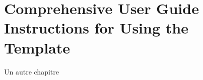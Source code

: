 \chapter[Comprehensive User Guide: Instructions for Using the Template]{Comprehensive User Guide Instructions for Using the Template}
\label{cp:user-guide}

Un autre chapitre